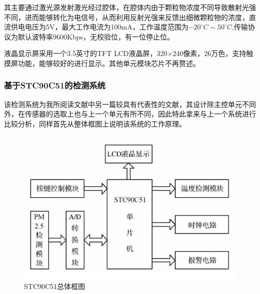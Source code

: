 \documentclass[12pt]{ctexart}
\begin{document}
\par{} 其主要通过激光源发射激光经过腔体，在腔体内由于颗粒物浓度不同导致散射光强不同，进而能够转化为电信号，从而利用反射光强来反馈出细微颗粒物的浓度，直流供电电压为5V，最大工作电流为100mA，工作温度范围为$-20^{\circ} C\sim 50^{\circ}C$,传输协议为默认波特率9600Kbps，无校验位，有一位停止位。
\par{} 液晶显示屏采用一个3.5英寸的TFT LCD液晶屏，320$\times 240$像素，26万色，支持触摸屏功能，能够较好的进行显示。其他单元模块芯片不再赘述。
\subsubsection{基于STC90C51的检测系统}
\par{} 该检测系统为我所阅读文献中另一篇较具有代表性的文献，其设计除主控单元不同外，在传感器的选取上也与上一个单元有所不同，因此特此拿来与上一个系统进行比较分析，同样首先从整体框图上说明该系统的工作原理。
\begin{figure}[H]
  \centering
  \includegraphics[scale = 0.65 ]{1-4.png}
  \caption{STC90C51总体框图}
  \label{img4} 
\end{figure}
\end{document}
